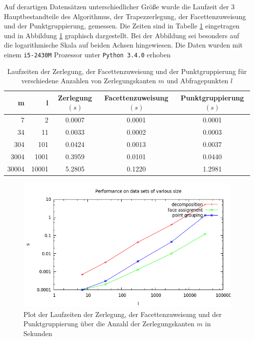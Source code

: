\documentclass[11pt, a4paper]{article}
\begin{document}
Auf derartigen Datensätzen unterschiedlicher Größe wurde die Laufzeit der 3 Hauptbestandteile des Algorithmus, der Trapezzerlegung, der Facettenzuweisung und der Punktgruppierung, gemessen. Die Zeiten sind in Tabelle \ref{tab:performance_table} eingetragen und in Abbildung \ref{fig:performance_plot} graphisch dargestellt. Bei der Abbildung sei besonders auf die logarithmische Skala auf beiden Achsen hingewiesen. Die Daten wurden mit einem \texttt{i5-2430M} Prozessor unter \texttt{Python 3.4.0} erhoben

\begin{table}[h!]
	\centering
	\begin{tabular}{|r|r|c|c|c|}
		\hline
		m & l & Zerlegung $(s)$ & Facettenzuweisung $(s)$ & Punktgruppierung $(s)$ \\
		\hline
		7 & 2 & 0.0007 & 0.0001 & 0.0001 \\
		34 & 11 & 0.0033 & 0.0002 & 0.0003 \\
		304 & 101 & 0.0424 & 0.0013 & 0.0037 \\
		3004 & 1001 & 0.3959 & 0.0101 & 0.0440 \\
		30004 & 10001 & 5.2805 & 0.1220 & 1.2981 \\
		\hline
	\end{tabular}
	\caption{Laufzeiten der Zerlegung, der Facettenzuweisung und der Punktgruppierung für verschiedene Anzahlen von Zerlegungskanten $m$ und Abfragepunkten $l$}
	\label{tab:performance_table}
\end{table}

\begin{figure}[h!]
	\centering
	\includegraphics[width=\textwidth]{performance}
	\caption{Plot der Laufzeiten der Zerlegung, der Facettenzuweisung und der Punktgruppierung über die Anzahl der Zerlegungskanten $m$ in Sekunden}
	\label{fig:performance_plot}
\end{figure}
\end{document}
